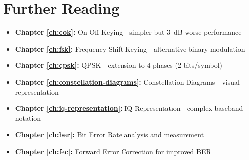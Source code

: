 \section{Further Reading}

\begin{itemize}
\item \textbf{Chapter \ref{ch:ook}:} On-Off Keying---simpler but 3~dB worse performance
\item \textbf{Chapter \ref{ch:fsk}:} Frequency-Shift Keying---alternative binary modulation
\item \textbf{Chapter \ref{ch:qpsk}:} QPSK---extension to 4 phases (2 bits/symbol)
\item \textbf{Chapter \ref{ch:constellation-diagrams}:} Constellation Diagrams---visual representation
\item \textbf{Chapter \ref{ch:iq-representation}:} IQ Representation---complex baseband notation
\item \textbf{Chapter \ref{ch:ber}:} Bit Error Rate analysis and measurement
\item \textbf{Chapter \ref{ch:fec}:} Forward Error Correction for improved BER
\end{itemize}
